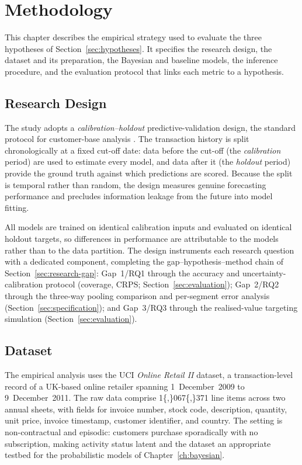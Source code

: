 \chapter{Methodology}
\label{ch:methodology}

This chapter describes the empirical strategy used to evaluate the three hypotheses of Section~\ref{sec:hypotheses}. It specifies the research design, the dataset and its preparation, the Bayesian and baseline models, the inference procedure, and the evaluation protocol that links each metric to a hypothesis.

\section{Research Design}
\label{sec:design}

The study adopts a \emph{calibration--holdout} predictive-validation design, the standard protocol for customer-base analysis \parencite{fader2005}. The transaction history is split chronologically at a fixed cut-off date: data before the cut-off (the \emph{calibration} period) are used to estimate every model, and data after it (the \emph{holdout} period) provide the ground truth against which predictions are scored. Because the split is temporal rather than random, the design measures genuine forecasting performance and precludes information leakage from the future into model fitting.

All models are trained on identical calibration inputs and evaluated on identical holdout targets, so differences in performance are attributable to the models rather than to the data partition. The design instruments each research question with a dedicated component, completing the gap--hypothesis--method chain of Section~\ref{sec:research-gap}: Gap~1/RQ1 through the accuracy and uncertainty-calibration protocol (coverage, CRPS; Section~\ref{sec:evaluation}); Gap~2/RQ2 through the three-way pooling comparison and per-segment error analysis (Section~\ref{sec:specification}); and Gap~3/RQ3 through the realised-value targeting simulation (Section~\ref{sec:evaluation}).

\section{Dataset}
\label{sec:dataset}

The empirical analysis uses the UCI \emph{Online Retail II} dataset, a transaction-level record of a UK-based online retailer spanning 1~December~2009 to 9~December~2011. The raw data comprise \num{1{,}067{,}371} line items across two annual sheets, with fields for invoice number, stock code, description, quantity, unit price, invoice timestamp, customer identifier, and country. The setting is non-contractual and episodic: customers purchase sporadically with no subscription, making activity status latent and the dataset an appropriate testbed for the probabilistic models of Chapter~\ref{ch:bayesian}.

